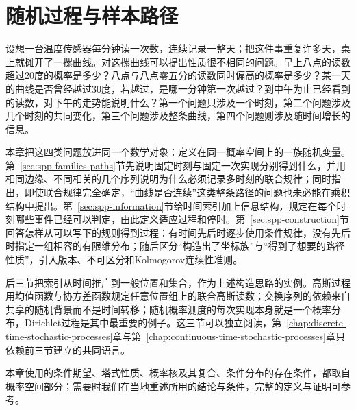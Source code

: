 \chapter{随机过程与样本路径}
\label{chap:stochastic-processes-and-sample-paths}

设想一台温度传感器每分钟读一次数，连续记录一整天；把这件事重复许多天，桌上就摊开了一摞曲线。对这摞曲线可以提出性质很不相同的问题。早上八点的读数超过$20$度的概率是多少？八点与八点零五分的读数同时偏高的概率是多少？某一天的曲线是否曾经越过$30$度，若越过，是哪一分钟第一次越过？到中午为止已经看到的读数，对下午的走势能说明什么？第一个问题只涉及一个时刻，第二个问题涉及几个时刻的共同变化，第三个问题涉及整条曲线，第四个问题则涉及随时间增长的信息。

本章把这四类问题放进同一个数学对象：定义在同一概率空间上的一族随机变量。第~\ref{sec:spp-families-paths}节先说明固定时刻与固定一次实现分别得到什么，并用相同边缘、不同相关的几个序列说明为什么必须记录多时刻的联合规律；同时指出，即使联合规律完全确定，“曲线是否连续”这类整条路径的问题也未必能在乘积结构中提出。第~\ref{sec:spp-information}节给时间索引加上信息结构，规定在每个时刻哪些事件已经可以判定，由此定义适应过程和停时。第~\ref{sec:spp-construction}节回答怎样从可以写下的规则得到过程：有时间先后时逐步使用条件规律，没有先后时指定一组相容的有限维分布；随后区分“构造出了坐标族”与“得到了想要的路径性质”，引入版本、不可区分和Kolmogorov连续性准则。

后三节把索引从时间推广到一般位置和集合，作为上述构造思路的实例。高斯过程用均值函数与协方差函数规定任意位置组上的联合高斯读数；交换序列的依赖来自共享的随机背景而不是时间转移；随机概率测度的每次实现本身就是一个概率分布，Dirichlet过程是其中最重要的例子。这三节可以独立阅读，第~\ref{chap:discrete-time-stochastic-processes}章与第~\ref{chap:continuous-time-stochastic-processes}章只依赖前三节建立的共同语言。

本章使用的条件期望、塔式性质、概率核及其复合、条件分布的存在条件，都取自概率空间部分；需要时我们在当地重述所用的结论与条件，完整的定义与证明可参考。








